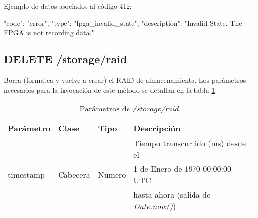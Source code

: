 \begin{itemize}
{\begin{minipage}{\textwidth}
Ejemplo de datos asociados al código 412:

\begin{code}[language=json]
{
  "code": "error",
  "type": "fpga_invalid_state",
  "description": "Invalid State. The FPGA is not recording data."
}
\end{code}
\end{minipage}
}

\end{itemize}

%
%
\subsection{DELETE /storage/raid}
Borra (formatea y vuelve a crear) el \gls{RAID} de almacenamiento. Los parámetros necesarios para la invocación de este método se detallan en la tabla \ref{extra:api:storageraid:invocacion}.

\begin{table}[H]
\centering
\begin{tabular}{|l|l|l|l|}
\hline
\rowcolor[HTML]{F5F5F5}
\textbf{Parámetro}  & \textbf{Clase} & \textbf{Tipo}   & \textbf{Descripción}                         \\ \hline
                    &                &                 & Tiempo transcurrido (ms) desde el            \\
timestamp           & Cabecera       & Número          & 1 de Enero de 1970 00:00:00 UTC              \\
                    &                &                 & hasta ahora (salida de \textit{Date.now()})  \\ \hline
\end{tabular}
\caption{Parámetros de \textit{/storage/raid}}
\label{extra:api:storageraid:invocacion}
\end{table}

